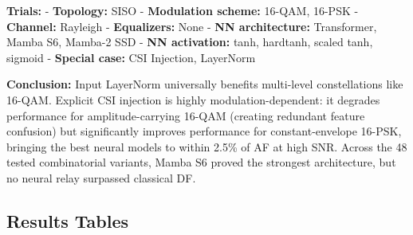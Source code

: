\documentclass[
  english,
  12pt,
  12pt,
  a4paper,
  oneside]{report}
\begin{document}
\textbf{Trials:} - \textbf{Topology:} SISO - \textbf{Modulation scheme:} 16-QAM, 16-PSK - \textbf{Channel:} Rayleigh - \textbf{Equalizers:} None - \textbf{NN architecture:} Transformer, Mamba S6, Mamba-2 SSD - \textbf{NN activation:} tanh, hardtanh, scaled tanh, sigmoid - \textbf{Special case:} CSI Injection, LayerNorm

\textbf{Conclusion:} Input LayerNorm universally benefits multi-level constellations like 16-QAM. Explicit CSI injection is highly modulation-dependent: it degrades performance for amplitude-carrying 16-QAM (creating redundant feature confusion) but significantly improves performance for constant-envelope 16-PSK, bringing the best neural models to within 2.5\% of AF at high SNR. Across the 48 tested combinatorial variants, Mamba S6 proved the strongest architecture, but no neural relay surpassed classical DF.

\subsection{Results Tables}\label{sec:results-tables-4}
\end{document}
